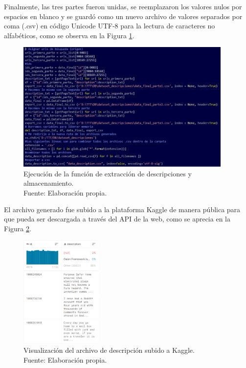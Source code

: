 Finalmente, las tres partes fueron unidas, se reemplazaron los valores nulos por espacios en blanco y se guardó como un nuevo archivo de valores separados por coma (.csv) en código Unicode UTF-8 para la lectura de caracteres no alfabéticos, como se observa en la Figura \ref{4:fig6}.

\begin{figure}[!ht]
	\begin{center}
		\includegraphics[width=0.95\textwidth]{4/figures/description_scraping_execution.jpg}
		\caption[Ejecución de la función de extracción de descripciones y almacenamiento]{Ejecución de la función de extracción de descripciones y almacenamiento.\\
			Fuente: Elaboración propia.}
		\label{4:fig6}
	\end{center}
\end{figure}

El archivo generado fue subido a la plataforma Kaggle de manera pública para que pueda ser descargada a través del API de la web, como se aprecia en la Figura \ref{4:fig7}.

\begin{figure}[!ht]
	\begin{center}
		\includegraphics[width=0.36\textwidth]{4/figures/description_kaggle_preview.jpg}
		\caption[Visualización del archivo de descripción subido a Kaggle]{Visualización del archivo de descripción subido a Kaggle.\\
			Fuente: Elaboración propia.}
		\label{4:fig7}
	\end{center}
\end{figure}

